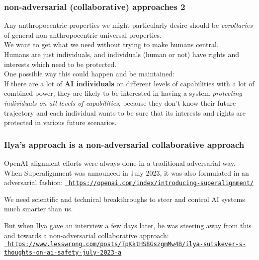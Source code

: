 \documentclass{beamer}
\newenvironment{customquote}
  {\begin{adjustwidth}{2em}{2em}\noindent\textnormal}
  {\end{adjustwidth}}
\newcommand{\msblue}[1]{{\color{myblue} #1}}
\begin{document}
\begin{frame}

  \frametitle{non-adversarial (collaborative) approaches 2}

Any anthropocentric properties we might particularly desire should be
{\em corollaries} of general non-anthropocentric universal properties.\\[2ex]

We want to get what we need without trying to make humans central.\\[2ex]

Humans are just individuals, and individuals (human or not) have rights and interests 
which need to be protected.\\[2ex]

One possible way this could happen and be maintained:\\[2ex]

If there are a lot of {\bf AI individuals} on different levels of capabilities with a lot of combined power,
they are likely to be interested in having a system {\em protecting individuals on all levels of
capabilities}, because they don't know their future trajectory and each individual wants to be sure that
its interests and rights are protected in various future scenarios.

\end{frame}

\begin{frame}

  \frametitle{Ilya's approach is a non-adversarial collaborative approach}

OpenAI alignment efforts were always done in a traditional adversarial way.\\[2ex]

When Superalignment was announced in July 2023, it was also formulated
in an adversarial fashion: \href{https://openai.com/index/introducing-superalignment/}{\tt\tiny \msblue{https://openai.com/index/introducing-superalignment/}}\\[2ex]

\begin{customquote}
We need scientific and technical breakthroughs to steer and control AI systems much smarter than us.\\[2ex]
\end{customquote}

But when Ilya gave an interview a few days later, he was steering away from this and towards
a non-adversarial collaborative approach:\\[2ex]

\href{https://www.lesswrong.com/posts/TpKktHS8GszgmMw4B/ilya-sutskever-s-thoughts-on-ai-safety-july-2023-a}{\tt\tiny \msblue{https://www.lesswrong.com/posts/TpKktHS8GszgmMw4B/ilya-sutskever-s-thoughts-on-ai-safety-july-2023-a}}

\end{frame}
\end{document}
